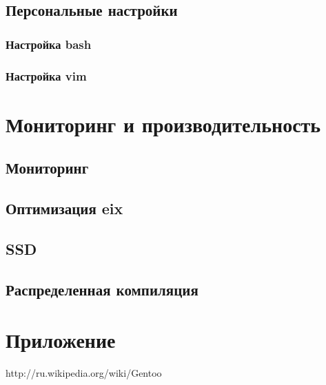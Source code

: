 \documentclass[12pt, a4paper]{article}
\begin{document}
\subsection{Персональные настройки}

\subsubsection{Настройка bash}

\subsubsection{Настройка vim}

\newpage
\section{Мониторинг и производительность}

\subsection{Мониторинг}

\subsection{Оптимизация eix}

\subsection{SSD}

\subsection{Распределенная компиляция}

\newpage

\section{Приложение}


\newpage
\begin{thebibliography}{99}

	 http://ru.wikipedia.org/wiki/Gentoo
	
	

\end{thebibliography}
\end{document}
